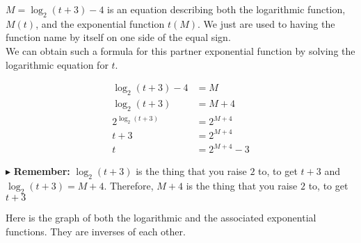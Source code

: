 \documentclass{ximera}
\begin{document}
$M = \log_2(t+3) - 4$ is an equation describing both the logarithmic function, $M(t)$, and the exponential function $t(M)$.  We just are used to having the function name by itself on one side of the equal sign. \\


We can obtain such a formula for this partner exponential function by solving the logarithmic equation for $t$.





\begin{align*}
\log_2(t+3) - 4 & = M \\
\log_2(t+3) & = M + 4 \\
2^{\log_2(t+3)} & = 2^{M+4} \\
t+3 & = 2^{M+4} \\
t & = 2^{M+4} - 3
\end{align*}


$\blacktriangleright$ \textbf{Remember:} $\log_2(t+3)$ is the thing that you raise $2$ to, to get $t+3$ and $\log_2(t+3) = M+4$.  Therefore, $M+4$ is the thing that you raise $2$ to, to get $t+3$





Here is the graph of both the logarithmic and the associated exponential functions. They are inverses of each other.
\end{document}
